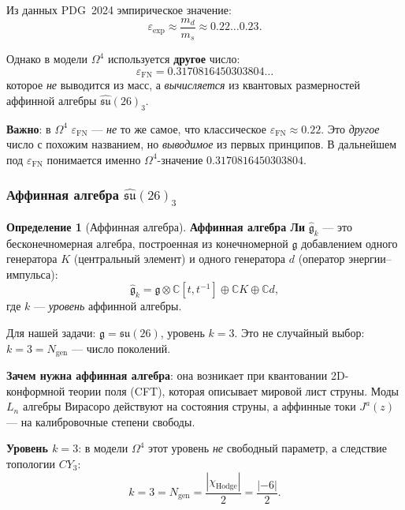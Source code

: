 \documentclass[11pt,a4paper]{article}
\newcommand{\CY}{\ensuremath{CY_3}}
\newcommand{\Om}{\ensuremath{\Omega^4}}
\newcommand{\Ngen}{\ensuremath{N_{\text{gen}}}}
\newcommand{\epsFN}{\ensuremath{\varepsilon_{\text{FN}}}}
\theoremstyle{definition}
\newtheorem{definition}[theorem]{Определение}
\begin{document}
Из данных PDG~2024 эмпирическое значение:
\begin{equation}
    \varepsilon_{\text{exp}} \approx \frac{m_d}{m_s} \approx 0.22 \ldots 0.23.
\end{equation}

Однако в модели $\Om$ используется \textbf{другое} число:
\begin{equation}
    \boxed{\; \epsFN = 0.3170816450303804\ldots \;}
\end{equation}
которое \emph{не} выводится из масс, а \emph{вычисляется} из
квантовых размерностей аффинной алгебры $\hat{\mathfrak{su}}(26)_3$.

\medskip\noindent
\textbf{Важно}: в $\Om$ $\epsFN$ --- \emph{не} то же самое, что
классическое $\varepsilon_{\text{FN}} \approx 0.22$. Это
\emph{другое} число с похожим названием, но \emph{выводимое} из
первых принципов. В дальнейшем под $\epsFN$ понимается именно
$\Om$-значение $0.3170816450303804$.

\subsubsection{Аффинная алгебра \texorpdfstring{$\hat{\mathfrak{su}}(26)_3$}{su(26)\_3}}

\begin{definition}[Аффинная алгебра]
\label{def:affine}
\textbf{Аффинная алгебра Ли} $\hat{\mathfrak{g}}_k$ --- это
бесконечномерная алгебра, построенная из конечномерной $\mathfrak{g}$
добавлением одного генератора $K$ (центральный элемент) и
одного генератора $d$ (оператор энергии--импульса):
\begin{equation}
    \hat{\mathfrak{g}}_k = \mathfrak{g} \otimes \mathbb{C}[t, t^{-1}]
    \oplus \mathbb{C}K \oplus \mathbb{C}d,
\end{equation}
где $k$ --- \emph{уровень} аффинной алгебры.
\end{definition}

Для нашей задачи: $\mathfrak{g} = \mathfrak{su}(26)$, уровень $k = 3$.
Это не случайный выбор: $k = 3 = \Ngen$ --- число поколений.

\medskip\noindent
\textbf{Зачем нужна аффинная алгебра}: она возникает при
квантовании 2D-конформной теории поля (CFT), которая описывает
мировой лист струны. Моды $L_n$ алгебры Вирасоро действуют на
состояния струны, а аффинные токи $J^a(z)$ --- на калибровочные
степени свободы.

\medskip\noindent
\textbf{Уровень $k = 3$}: в модели $\Om$ этот уровень
\emph{не} свободный параметр, а следствие топологии $\CY$:
\begin{equation}
    k = 3 = \Ngen = \frac{|\chi_{\text{Hodge}}|}{2} = \frac{|-6|}{2}.
\end{equation}
\end{document}
